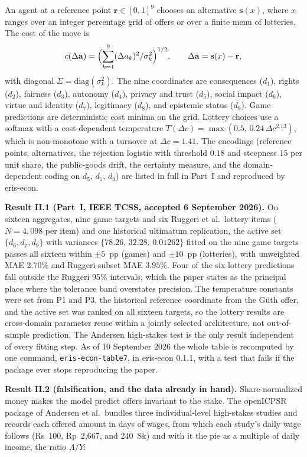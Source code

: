 \documentclass[11pt,onecolumn]{IEEEtran}
\begin{document}
An agent at a reference point $\mathbf r\in[0,1]^9$ chooses an alternative $\mathbf s(x)$, where $x$ ranges over an integer percentage grid of offers or over a finite menu of lotteries.
The cost of the move is
\begin{equation}
c(\Delta\mathbf a)=\Bigl(\sum_{k=1}^{9}(\Delta a_k)^2/\sigma_k^2\Bigr)^{1/2},\qquad \Delta\mathbf a=\mathbf s(x)-\mathbf r,
\end{equation}
with diagonal $\Sigma=\mathrm{diag}(\sigma_k^2)$.
The nine coordinates are consequences ($d_1$), rights ($d_2$), fairness ($d_3$), autonomy ($d_4$), privacy and trust ($d_5$), social impact ($d_6$), virtue and identity ($d_7$), legitimacy ($d_8$), and epistemic status ($d_9$).
Game predictions are deterministic cost minima on the grid.
Lottery choices use a softmax with a cost-dependent temperature $T(\Delta c)=\max(0.5,\,0.24\,\Delta c^{2.13})$, which is non-monotone with a turnover at $\Delta c=1.41$.
The encodings (reference points, alternatives, the rejection logistic with threshold $0.18$ and steepness $15$ per unit share, the public-goods drift, the certainty measure, and the domain-dependent coding on $d_5$, $d_7$, $d_9$) are listed in full in Part~I and reproduced by eris-econ.

\textbf{Result II.1 (Part~I, IEEE TCSS, accepted 6 September 2026).}
On sixteen aggregates, nine game targets and six Ruggeri et al.\ lottery items ($N=4{,}098$ per item) and one historical ultimatum replication, the active set $\{d_6,d_7,d_9\}$ with variances $\{78.26,\,32.28,\,0.01262\}$ fitted on the nine game targets passes all sixteen within $\pm5$~pp (games) and $\pm10$~pp (lotteries), with unweighted MAE $2.70\%$ and Ruggeri-subset MAE $3.95\%$.
Four of the six lottery predictions fall outside the Ruggeri 95\% intervals, which the paper states as the principal place where the tolerance band overstates precision.
The temperature constants were set from P1 and P3, the historical reference coordinate from the G\"uth offer, and the active set was ranked on all sixteen targets, so the lottery results are cross-domain parameter reuse within a jointly selected architecture, not out-of-sample prediction.
The Andersen high-stakes test is the only result independent of every fitting step.
As of 10 September 2026 the whole table is recomputed by one command, \texttt{eris-econ-table7}, in eris-econ 0.1.1, with a test that fails if the package ever stops reproducing the paper.

\textbf{Result II.2 (falsification, and the data already in hand).}
Share-normalized money makes the model predict offers invariant to the stake.
The openICPSR package of Andersen et al.\ bundles three individual-level high-stakes studies and records each offered amount in days of wages, from which each study's daily wage follows (Rs~100, Rp~2{,}667, and 240~Sk) and with it the pie as a multiple of daily income, the ratio $\Lambda/Y$:
\end{document}
